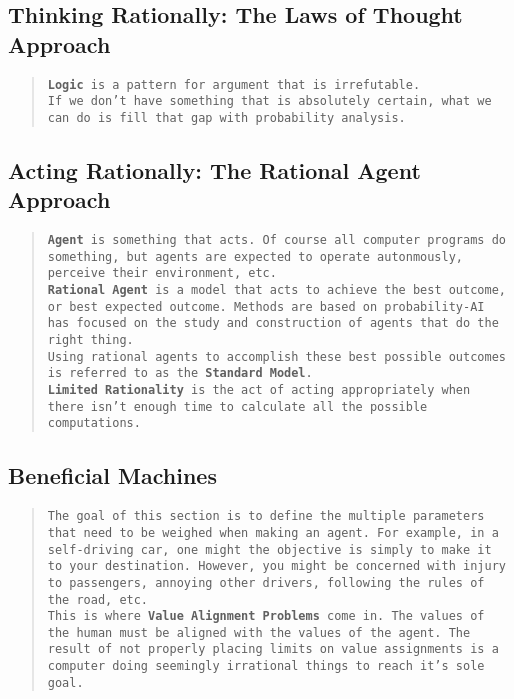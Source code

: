 \documentclass{article}
\begin{document}
\subsection{Thinking Rationally: The Laws of Thought Approach}
\begin{quote}
    \texttt{\textbf{Logic} is a pattern for argument that is irrefutable. \\ If we don't have something that is absolutely certain, what we can do is fill that gap with probability analysis.}
\end{quote}
\subsection{Acting Rationally: The Rational Agent Approach}
\begin{quote}
    \texttt{\textbf{Agent} is something that acts. Of course all computer programs do something, but agents are expected to operate autonmously, perceive their environment, etc.
        \\ \textbf{Rational Agent} is a model that acts to achieve the best outcome, or best expected outcome. Methods are based on probability-AI has focused on the study and construction of agents that do the right thing. \\
        Using rational agents to accomplish these best possible outcomes is referred to as the \textbf{Standard Model}. \\
        \textbf{Limited Rationality} is the act of acting appropriately when there isn't enough time to calculate all the possible computations.}
\end{quote}
\subsection{Beneficial Machines}
\begin{quote}
    \texttt{The goal of this section is to define the multiple parameters that need to be weighed when making an agent. For example, in a self-driving car, one might
        the objective is simply to make it to your destination. However, you might be concerned with injury to passengers, annoying other drivers, following the rules of the road, etc.
        \\ This is where \textbf{Value Alignment Problems} come in. The values of the human must be aligned with the values of the agent. The result of not properly
        placing limits on value assignments is a computer doing seemingly irrational things to reach it's sole goal.}
\end{quote}
\end{document}
